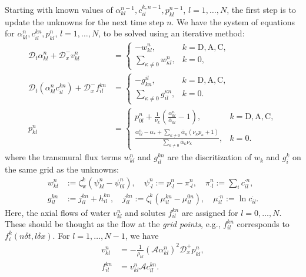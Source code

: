 \documentclass{article}
\begin{document}
Starting with known values of $\alpha^{n-1}_{kl},c_{il}^{k,n-1}, p_{kl}^{n-1}$, $l = 1,\dots,N$, the first step is to update the unknowns for the next time step $n$.
We have the system of equations for $\alpha^{n}_{kl},c_{il}^{kn}, p_{kl}^{n}$, $l=1,\dots,N$, to be solved using an iterative method:
\begin{align}
    \mathcal{D}_t \alpha_{kl}^n + \mathcal{D}_x^-v_{kl}^n &= \begin{cases}
        -w_{kl}^{n},\quad &k=\mathrm{D},\mathrm{A},\mathrm{C},\\
        \sum_{\kappa\neq 0} w_{\kappa l}^n, &k=0,
    \end{cases}\\
    \mathcal{D}_t (\alpha_{kl}^nc_{il}^{kn})+\mathcal{D}_x^-f_{il}^{kn}&=\begin{cases}
        -g_{k n}^{il}, &k=\mathrm{D},\mathrm{A},\mathrm{C},\\
        \sum_{\kappa \neq 0}g_{il}^{\kappa n}, &k=0.
    \end{cases}\\
    p_{kl}^n &= \begin{cases}
        p_{0l}^n + \frac{1}{\nu_k}\left( \frac{\alpha_{kl}^n}{\bar{\alpha}_{kl}} - 1\right),\quad &k=\mathrm{D},\mathrm{A},\mathrm{C},\\
        \frac{\alpha_{0l}^n - \alpha_* + \sum_{\kappa\neq 0}\bar{\alpha}_\kappa (\nu_\kappa p_\kappa +1)}{\sum_{\kappa\neq 0}\bar{\alpha}_\kappa \nu_\kappa }, &k=0.
    \end{cases}
\end{align}
where the transmural flux terms $w_{kl}^n$ and $g_{il}^{kn}$ are the discritization of $w_k$ and $g_i^k$ on the same grid as the unknowns:
\begin{align}
    w_{kl}^n &:=\zeta_\mathrm{w}^k\left( \psi_{kl}^n-\psi_{0l}^n \right),\quad
    \psi_{\cdot l}^n:= p_{\cdot l}^n - \pi_{\cdot l}^n,\quad \pi_{\cdot l}^n:= \sum_i c_{il}^{\cdot n},\\
    g_{il}^{kn}&:= j_{il}^{kn}+h_{il}^{kn},\quad j_{il}^{kn}:=\zeta_i^k\left( \mu_{il}^{kn} - \mu_{il}^{0n} \right),\quad \mu_{il}^{\cdot n}:= \ln c_{il}^{\cdot}.
\end{align}
Here, the axial flows of water $v_{kl}^n$ and solutes $f_{il}^{kn}$ are assigned for $l=0,\dots,N$.
These should be thought as the flow at the \textit{grid points}, e.g., $f_{il}^{kn}$ corresponds to $f_i^k(n\delta t,l\delta x)$.
For $l=1,\dots,N-1$, we have
\begin{align}
    v_{kl}^n &= -\frac{1}{\rho_{kl}}(\mathcal{A}\alpha_{kl}^n)^2 \mathcal{D}_x^+p_{kl}^n,\\
    f_{il}^{kn} &= v_{kl}^n \mathcal{A}c_{il}^{kn}.
\end{align}
\end{document}
